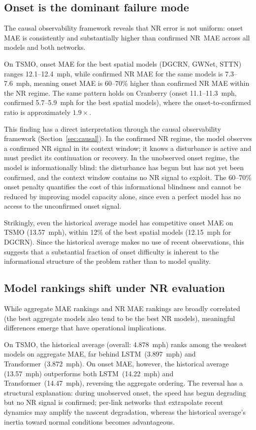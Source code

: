 \documentclass[a4paper]{cas-sc}
\begin{document}
\subsection{Onset is the dominant failure mode}
\label{sec:finding2}

The causal observability framework reveals that NR error is not
uniform: onset MAE is consistently and substantially higher than
confirmed NR~MAE across all models and both networks.

On TSMO, onset MAE for the best spatial models (DGCRN, GWNet, STTN)
ranges 12.1--12.4~mph, while confirmed NR MAE for the same models
is 7.3--7.6~mph, meaning onset MAE is 60--70\% higher than confirmed
NR MAE within the NR regime.
The same pattern holds on Cranberry (onset 11.1--11.3~mph,
confirmed 5.7--5.9~mph for the best spatial models),
where the onset-to-confirmed ratio is approximately $1.9\times$.

This finding has a direct interpretation through the causal
observability framework (Section~\ref{sec:causal}).
In the confirmed NR regime, the model observes a confirmed NR
signal in its context window; it knows a disturbance is active
and must predict its continuation or recovery.
In the unobserved onset regime, the model is informationally blind:
the disturbance has begun but has not yet been confirmed,
and the context window contains no NR signal to exploit.
The 60--70\% onset penalty quantifies the cost of this informational
blindness and cannot be reduced by improving model capacity alone,
since even a perfect model has no access to the unconfirmed onset
signal.

Strikingly, even the historical average model has competitive onset
MAE on TSMO (13.57~mph), within 12\% of the best spatial models
(12.15~mph for DGCRN).
Since the historical average makes no use of recent observations,
this suggests that a substantial fraction of onset difficulty is
inherent to the informational structure of the problem rather than
to model quality.

\subsection{Model rankings shift under NR evaluation}
\label{sec:finding3}

While aggregate MAE rankings and NR MAE rankings are broadly
correlated (the best aggregate models also tend to be the best
NR models), meaningful differences emerge that have
operational implications.

On TSMO, the historical average (overall: 4.878~mph) ranks among the
weakest models on aggregate MAE, far behind LSTM~(3.897~mph)
and Transformer~(3.872~mph).
On onset MAE, however, the historical average (13.57~mph) outperforms
both LSTM~(14.22~mph) and Transformer~(14.47~mph), reversing the
aggregate ordering.
The reversal has a structural explanation: during unobserved onset,
the speed has begun degrading but no NR signal is confirmed; per-link
networks that extrapolate recent dynamics may amplify the nascent
degradation, whereas the historical average's inertia toward normal
conditions becomes advantageous.
\end{document}
